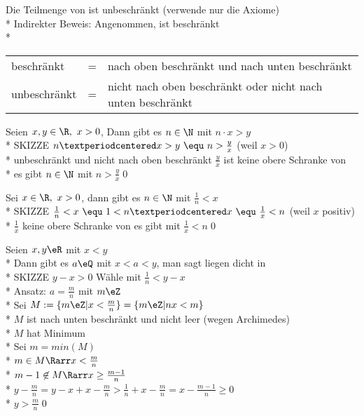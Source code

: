 Die Teilmenge \N{} von \R{} ist unbeschränkt
\bew
(verwende nur die Axiome)\\*
Indirekter Beweis: Angenommen, \N{} ist beschränkt\\*
\begin{tabular}{lcl}
beschränkt &=& nach oben beschränkt und nach unten beschränkt\\*
unbeschränkt &=& nicht nach oben beschränkt oder nicht nach unten beschränkt
\end{tabular}
%
Seien $x,y\in\R,\ x>0$, Dann gibt es $n\in\N$ mit $n·x>y$\\*
SKIZZE %
%
\bew
$n·x>y\ \equ\ n>\frac{y}{x}$ (weil $x>0$)\\*
\N{} unbeschränkt und nicht nach oben beschränkt \Rarr{} $\frac{y}{x}$ ist keine obere Schranke von \N\\*
\Rarr{} es gibt $n\in\N$ mit $n>\frac{y}{x}$\qed

Sei $x\in\R,\ x>0$, dann gibt es $n\in\N$ mit $\frac{1}{n}<x$\\*
SKIZZE %
\bew
$\frac{1}{n}<x\ \equ\ 1<n·x\ \equ\ \frac{1}{x}<n$ (weil $x$ positiv)\\*
$\frac{1}{x}$ keine obere Schranke von \N{} \Rarr{} es gibt \nN{} mit $\frac{1}{x}<n$\qed

Seien $x,y\eR$ mit $x<y$\\*
Dann gibt es $a\eQ$ mit $x<a<y$, man sagt \Q{} liegen dicht in \R\\*
SKIZZE %
\bew
$y-x>0$ Wähle \nN{} mit $\frac{1}{n}<y-x$\\*
Ansatz: $a=\frac{m}{n}$ mit $m\eZ$\\*
Sei $M:=\{m\eZ|x<\frac{m}{n}\}=\{m\eZ|nx<m\}$\\*
$M$ ist nach unten beschränkt und nicht leer (wegen Archimedes)\\*
$M$ hat Minimum\\*
Sei $m=min(M)$\\*
$m\in M \Rarr x<\frac{m}{n}$\\*
$m-1\not\in M \Rarr x\geq\frac{m-1}{n}$\\*
$y-\frac{m}{n} =y-x+x-\frac{m}{n}>\frac{1}{n}+x-\frac{m}{n}=x-\frac{m-1}{n}\geq0$\\*
$y>\frac{m}{n}$\qed

